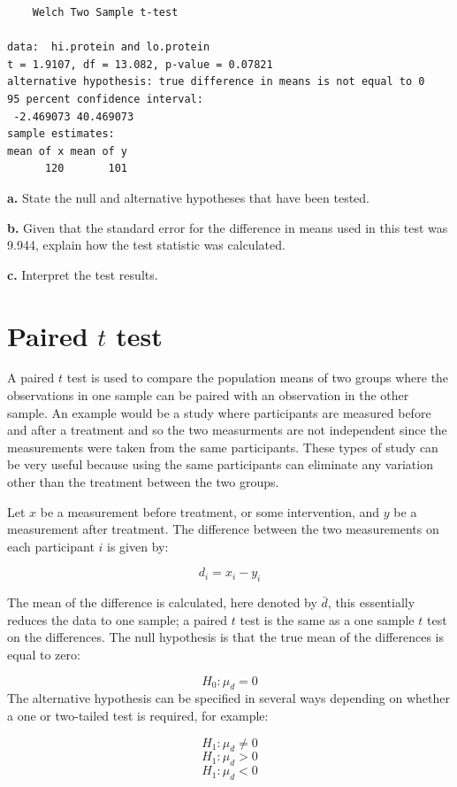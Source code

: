\documentclass[
  oneside]{krantz}
\begin{document}
\begin{verbatim}
    Welch Two Sample t-test

data:  hi.protein and lo.protein
t = 1.9107, df = 13.082, p-value = 0.07821
alternative hypothesis: true difference in means is not equal to 0
95 percent confidence interval:
 -2.469073 40.469073
sample estimates:
mean of x mean of y 
      120       101 
\end{verbatim}

\textbf{a.} State the null and alternative hypotheses that have been tested.

\textbf{b.} Given that the standard error for the difference in means used in this test was 9.944, explain how the test statistic was calculated.

\textbf{c.} Interpret the test results.

\hypertarget{paired-t-test}{%
\section{\texorpdfstring{Paired \(t\) test}{Paired t test}}\label{paired-t-test}}

A paired \(t\) test is used to compare the population means of two groups where the observations in one sample can be paired with an observation in the other sample. An example would be a study where participants are measured before and after a treatment and so the two measurments are not independent since the measurements were taken from the same participants. These types of study can be very useful because using the same participants can eliminate any variation other than the treatment between the two groups.

Let \(x\) be a measurement before treatment, or some intervention, and \(y\) be a measurement after treatment. The difference between the two measurements on each participant \(i\) is given by:

\[d_i = x_i - y_i\]

The mean of the difference is calculated, here denoted by \(\bar d\), this essentially reduces the data to one sample; a paired \(t\) test is the same as a one sample \(t\) test on the differences. The null hypothesis is that the true mean of the differences is equal to zero:

\[H_0: \mu_d = 0\]
The alternative hypothesis can be specified in several ways depending on whether a one or two-tailed test is required, for example:

\[H_1: \mu_d \ne 0\]
\[H_1: \mu_d > 0\]
\[H_1: \mu_d < 0\]
\end{document}
